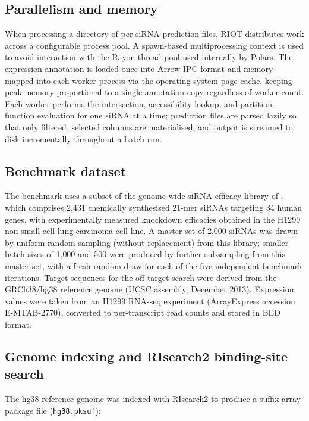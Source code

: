 \subsection*{Parallelism and memory}

When processing a directory of per-siRNA prediction files, RIOT distributes work across a configurable process pool.
A spawn-based multiprocessing context is used to avoid interaction with the Rayon thread pool used internally by Polars.
The expression annotation is loaded once into Arrow IPC format and memory-mapped into each worker process via the operating-system page cache, keeping peak memory proportional to a single annotation copy regardless of worker count.
Each worker performs the intersection, accessibility lookup, and partition-function evaluation for one siRNA at a time; prediction files are parsed lazily so that only filtered, selected columns are materialised, and output is streamed to disk incrementally throughout a batch run.

\subsection*{Benchmark dataset}

The benchmark uses a subset of the genome-wide siRNA efficacy library of \citet{huesken2005design}, which comprises 2{,}431 chemically synthesised 21-mer siRNAs targeting 34 human genes, with experimentally measured knockdown efficacies obtained in the H1299 non-small-cell lung carcinoma cell line.
A master set of 2{,}000 siRNAs was drawn by uniform random sampling (without replacement) from this library; smaller batch sizes of 1{,}000 and 500 were produced by further subsampling from this master set, with a fresh random draw for each of the five independent benchmark iterations.
Target sequences for the off-target search were derived from the GRCh38/hg38 reference genome (UCSC assembly, December 2013).
Expression values were taken from an H1299 RNA-seq experiment (ArrayExpress accession E-MTAB-2770), converted to per-transcript read counts and stored in BED format.

\subsection*{Genome indexing and RIsearch2 binding-site search}

The hg38 reference genome was indexed with RIsearch2 to produce a suffix-array package file (\texttt{hg38.pksuf}):


